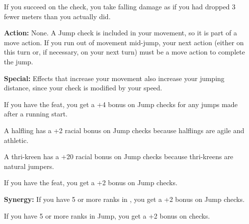 If you succeed on the check, you take falling damage as if you had dropped 3 fewer meters than you actually did.

\textbf{Action:} None. A Jump check is included in your movement, so it is part of a move action. If you run out of movement mid-jump, your next action (either on this turn or, if necessary, on your next turn) must be a move action to complete the jump.

\textbf{Special:} Effects that increase your movement also increase your jumping distance, since your check is modified by your speed.

If you have the  feat, you get a +4 bonus on Jump checks for any jumps made after a running start.

A halfling has a +2 racial bonus on Jump checks because halflings are agile and athletic.

A thri-kreen has a +20 racial bonus on Jump checks because thri-kreens are natural jumpers.

If you have the  feat, you get a +2 bonus on Jump checks.

\textbf{Synergy:} If you have 5 or more ranks in , you get a +2 bonus on Jump checks.

If you have 5 or more ranks in Jump, you get a +2 bonus on  checks.

